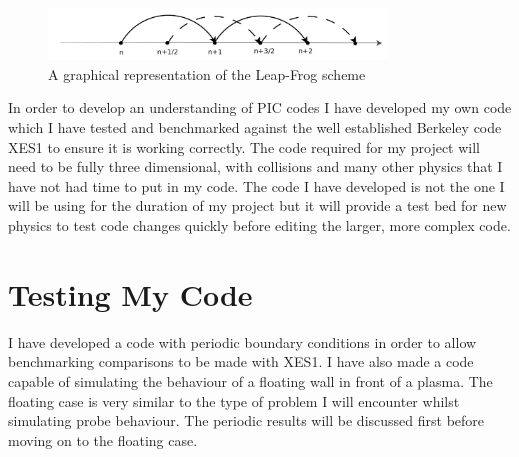 \documentclass[12pt]{article}
\begin{document}
\begin{figure}[H]
\centering
\includegraphics[width=0.8\textwidth]{Leapfrog}
\caption{A graphical representation of the Leap-Frog scheme\cite{shape}}
\label{fig:Leapfrog}
\end{figure}
In order to develop an understanding of PIC codes I have developed my own code which I have tested and benchmarked against the well established Berkeley code XES1 to ensure it is working correctly. The code required for my project will need to be fully three dimensional, with collisions and many other physics that I have not had time to put in my code. The code I have developed is not the one I will be using for the duration of my project but it will provide a test bed for new physics to test code changes quickly before editing the larger, more complex code. 

\section{Testing My Code}
I have developed a code with periodic boundary conditions in order to allow benchmarking comparisons to be made with XES1. I have also made a code capable of simulating the behaviour of a floating wall in front of a plasma. The floating case is very similar to the type of problem I will encounter whilst simulating probe behaviour. The periodic results will be discussed first before moving on to the floating case. 
\end{document}
